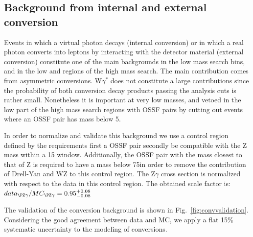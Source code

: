 \subsection{Background from internal and external conversion}
Events in which a virtual photon decays (internal conversion) or in
which a  real photon converts into leptons by interacting with the
detector material (external conversion) constitute one of the main backgrounds in the
 low mass search bins, and in the low \mmin  and \mlll
  regions of the high mass search. The main contribution comes from
  asymmetric conversions. W$\gamma^{*}$ does not constitute a large contributions since the
 probability of both conversion decay products passing the analysis
 \pt cuts is rather small. Nonetheless it is important at very low
 masses, and vetoed in the low \mlll  part of the high mass search
 regions with OSSF pairs by cutting out events where an OSSF pair has mass below 5\GeV.

In order to normalize and validate this background we use a control
region defined by the requirements first a OSSF pair
secondly \mlll be compatible with the Z mass within a 15\GeV
window. Additionally, the OSSF pair with the mass closest to that of Z
is required to have a mass below 75\GeV in order to remove the
contribution of Drell-Yan and WZ to this control region. The Z$\gamma$
cross section is normalized with respect to the data in this control
region. The obtained scale factor is:
$data_{\PZ\gamma}/MC_{\PZ\gamma} = 0.95_{-0.08}^{+0.08}$

The validation of the conversion background is shown in Fig.~\ref{fig:convvalidation}. Considering the good agreement between data and MC, we apply a flat 15\% systematic uncertainty to the modeling of conversions.

